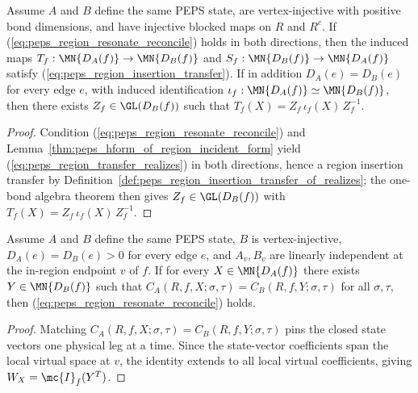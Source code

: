 \begin{lemma}
    \label{thm:peps_region_reconcile_to_transfer_gauge}
    \leanok
    Assume $A$ and $B$ define the same PEPS state, are vertex-injective with positive bond dimensions, and have injective blocked maps on $R$ and $R^c$. If (\ref{eq:peps_region_resonate_reconcile}) holds in both directions, then the induced maps $T_f:\MN{D_A(f)}\to\MN{D_B(f)}$ and $S_f:\MN{D_B(f)}\to\MN{D_A(f)}$ satisfy (\ref{eq:peps_region_insertion_transfer}). If in addition $D_A(e)=D_B(e)$ for every edge $e$, with induced identification $\iota_f:\MN{D_A(f)}\simeq\MN{D_B(f)}$, then there exists $Z_f\in\GL(D_B(f))$ such that $T_f(X)=Z_f\,\iota_f(X)\,Z_f^{-1}$.
\end{lemma}
\begin{proof}\leanok
    Condition (\ref{eq:peps_region_resonate_reconcile}) and Lemma~\ref{thm:peps_hform_of_region_incident_form} yield (\ref{eq:peps_region_transfer_realizes}) in both directions, hence a region insertion transfer by Definition~\ref{def:peps_region_insertion_transfer_of_realizes}; the one-bond algebra theorem then gives $Z_f\in\GL(D_B(f))$ with $T_f(X)=Z_f\,\iota_f(X)\,Z_f^{-1}$.
\end{proof}

\begin{lemma}
    \label{thm:peps_region_coeff_transfer_to_reconcile}
    \leanok
    Assume $A$ and $B$ define the same PEPS state, $B$ is vertex-injective, $D_A(e)=D_B(e)>0$ for every edge $e$, and $A_v,B_v$ are linearly independent at the in-region endpoint $v$ of $f$. If for every $X\in\MN{D_A(f)}$ there exists $Y\in\MN{D_B(f)}$ such that $C_A(R,f,X;\sigma,\tau)=C_B(R,f,Y;\sigma,\tau)$ for all $\sigma,\tau$, then (\ref{eq:peps_region_resonate_reconcile}) holds.
\end{lemma}
\begin{proof}\leanok
    Matching $C_A(R,f,X;\sigma,\tau)=C_B(R,f,Y;\sigma,\tau)$ pins the closed state vectors one physical leg at a time. Since the state-vector coefficients span the local virtual space at $v$, the identity extends to all local virtual coefficients, giving $W_X=\mc{I}_f(Y^T)$.
\end{proof}

